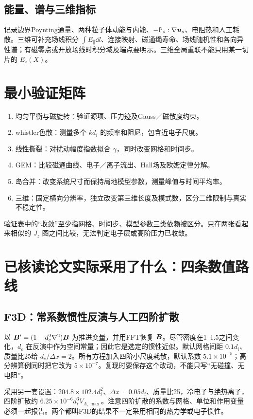 \documentclass[UTF8,a4paper,11pt,openany,fontset=fandol]{ctexbook}
\begin{document}
\subsection{能量、谱与三维指标}
记录边界Poynting通量、两种粒子体动能与内能、$-\mathsf P_s:\nabla\bm{u}_s$、电阻热和人工耗散。三维可补充场线积分 $\int E_\parallel\dd l$、连接映射、磁通绳寿命、场线随机性和各向异性谱；有磁零点或开放场线时积分域及端点要明示。三维全局重联不能只用某一切片的 $E_z(X)$。

\section{最小验证矩阵}
\begin{enumerate}
\item 均匀平衡与磁旋转：验证源项、压力迹及Gauss／磁散度约束。
\item whistler色散：测量多个 $kd_i$ 的频率和阻尼，包含近电子尺度。
\item 线性撕裂：对扰动幅度指数拟合 $\gamma$，同时改变网格和时间步。
\item GEM：比较磁通曲线、电子／离子流出、Hall场及欧姆定律分解。
\item 岛合并：改变系统尺寸而保持局地模型参数，测量峰值与时间平均率。
\item 三维：固定横向分辨率，独立改变第三维长度及模式数，区分二维限制与真实不稳定性。
\end{enumerate}
验证表中的“收敛”至少指网格、时间步、模型参数三类依赖被区分。只在两张看起来相似的 $J_z$ 图之间比较，无法判定电子层或高阶压力已收敛。

\section{已核读论文实际采用了什么：四条数值路线}
\subsection{F3D：常系数惯性反演与人工四阶扩散}
\citet{Shay2004}以 $\bm{B}'=(1-d_e^2\nabla^2)\bm{B}$ 为推进变量，并用FFT恢复 $\bm{B}$。尽管密度在1--1.5之间变化，$d_e$ 在反演中作为空间常量；因此它是选定的惯性近似。默认网格间距 $0.1d_i$、质量比25给 $d_e/\Delta x=2$。所有方程加入四阶小尺度耗散，默认系数 $5.1\times10^{-5}$；高分辨算例同时把它改为 $5\times10^{-7}$。复现时要保存这个改动，不能只写“无碰撞、无电阻”。

\citet{Cassak2008}采用另一套设置：$204.8\times102.4d_i^2$、$\Delta x=0.05d_i$、质量比25，冷电子与绝热离子，四阶扩散约 $6.25\times10^{-6}d_i^3V_{\!A,\max}$。注意四阶扩散的系数与网格、单位和作用变量必须一起报告。两个都叫F3D的结果不一定采用相同的热力学或电子惯性。
\end{document}
